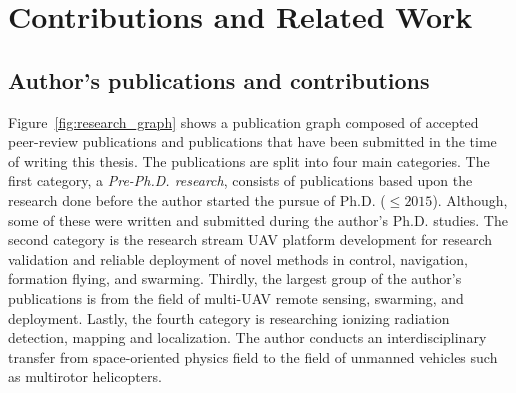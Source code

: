 \documentclass[a4paper,11pt,titlepage,twoside]{book}
\newcommand{\chapternoclear}[1]{
  \begingroup
  \let\cleardoublepage\clearpage
  \chapter{#1}
  \endgroup
}
\begin{document}
\chapternoclear{Contributions and Related Work\label{chap:sota}}

\section{Author's publications and contributions}

Figure~\ref{fig:research_graph} shows a publication graph composed of accepted peer-review publications and publications that have been submitted in the time of writing this thesis.
The publications are split into four main categories.
The first category, a \emph{Pre-Ph.D. research}, consists of publications based upon the research done before the author started the pursue of Ph.D. ($\leq 2015$).
Although, some of these were written and submitted during the author's Ph.D. studies.
The second category is the research stream \ac{UAV} platform development for research validation and reliable deployment of novel methods in control, navigation, formation flying, and swarming.
Thirdly, the largest group of the author's publications is from the field of multi-\ac{UAV} remote sensing, swarming, and deployment.
Lastly, the fourth category is researching ionizing radiation detection, mapping and localization.
The author conducts an interdisciplinary transfer from space-oriented physics field to the field of unmanned vehicles such as multirotor helicopters.

\end{document}
